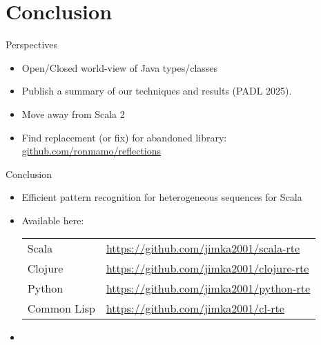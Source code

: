 \section{Conclusion}


\begin{frame}{Perspectives}
  \begin{itemize}
  \item Open/Closed world-view of Java types/classes
  \item Publish a summary of our techniques and results (PADL 2025).
  \item Move away from Scala 2
  \item Find replacement (or fix) for abandoned library:   \url{github.com/ronmamo/reflections}
  \end{itemize}
\end{frame}

{
\begin{frame}{Conclusion}
  \begin{itemize}
  \item Efficient pattern recognition for heterogeneous sequences for Scala
  \item Available here:

    \bigskip
    
    \begin{tabular}{ll}
    Scala & \url{https://github.com/jimka2001/scala-rte}\\
    Clojure & \url{https://github.com/jimka2001/clojure-rte}\\
    Python & \url{https://github.com/jimka2001/python-rte}\\
    Common Lisp & \url{https://github.com/jimka2001/cl-rte}    
  \end{tabular}


    \bigskip
    
  \item {}

  \end{itemize}
\end{frame}

}
